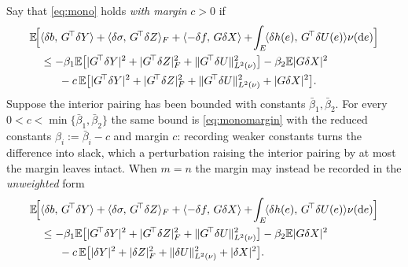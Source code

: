 \begin{remark}\label{rem:margin}
Say that \eqref{eq:mono} holds \emph{with margin} $c>0$ if
\begin{equation}\label{eq:monomargin}
\begin{aligned}
&\E\!\Big[\inner{\delta b}{\Gstar\delta Y}+\inner{\delta\sigma}{\Gstar\delta Z}_F
+\inner{-\delta f}{G\delta X}+\!\int_E\!\inner{\delta h(e)}{\Gstar\delta U(e)}\nu(\diff e)\Big]\\
&\quad\le-\beta_1\E\big[|\Gstar\delta Y|^2+|\Gstar\delta Z|_F^2+\Lnorm{\Gstar\delta U}^2\big]-\beta_2\E|G\delta X|^2\\
&\qquad\ \ -c\,\E\big[|\Gstar\delta Y|^2+|\Gstar\delta Z|_F^2+\Lnorm{\Gstar\delta U}^2+|G\delta X|^2\big] .
\end{aligned}
\end{equation}
Suppose the interior pairing has been bounded with constants $\bar\beta_1,\bar\beta_2$. For
every $0<c<\min\{\bar\beta_1,\bar\beta_2\}$ the same bound is \eqref{eq:monomargin} with the
reduced constants $\beta_i:=\bar\beta_i-c$ and margin $c$: recording weaker constants turns the
difference into slack, which a perturbation raising the interior pairing by at most the margin
leaves intact. When $m=n$ the margin may instead be recorded in the \emph{unweighted} form
\begin{equation}\label{eq:monomarginu}
\begin{aligned}
&\E\!\Big[\inner{\delta b}{\Gstar\delta Y}+\inner{\delta\sigma}{\Gstar\delta Z}_F
+\inner{-\delta f}{G\delta X}+\!\int_E\!\inner{\delta h(e)}{\Gstar\delta U(e)}\nu(\diff e)\Big]\\
&\quad\le-\beta_1\E\big[|\Gstar\delta Y|^2+|\Gstar\delta Z|_F^2+\Lnorm{\Gstar\delta U}^2\big]-\beta_2\E|G\delta X|^2\\
&\qquad\ \ -c\,\E\big[|\delta Y|^2+|\delta Z|_F^2+\Lnorm{\delta U}^2+|\delta X|^2\big] .
\end{aligned}
\end{equation}
\end{remark}
